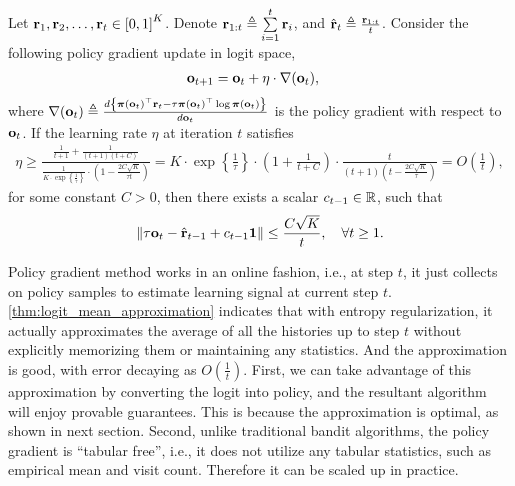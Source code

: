 \begin{thm}
\label{thm:logit_mean_approximation}
Let ${\mathbf{r}}_1, {\mathbf{r}}_2, \dots, {\mathbf{r}}_t \in \left[ 0, 1  \right]^K$. Denote ${\mathbf{r}}_{1:t} \triangleq \sum\limits_{i=1}^{t}{{\mathbf{r}}_i}$, and $\hat{{\mathbf{r}}}_t \triangleq \frac{{\mathbf{r}}_{1:t}}{t}$. Consider the following policy gradient update in logit space,
\begin{equation*}
\begin{split}
    {\mathbf{o}}_{t+1} &= {\mathbf{o}}_t + \eta \cdot \nabla({\mathbf{o}}_t),
\end{split}
\end{equation*}
where $\nabla({\mathbf{o}}_t) \triangleq \frac{d \left\{ {\boldsymbol{\pi}}({\mathbf{o}}_t)^\top {\mathbf{r}}_t - \tau {\boldsymbol{\pi}}({\mathbf{o}}_t)^\top \log{{\boldsymbol{\pi}}({\mathbf{o}}_t)} \right\} }{d {\mathbf{o}}_t} $ is the policy gradient with respect to ${\mathbf{o}}_t$. If the learning rate $\eta$ at iteration $t$ satisfies
\begin{equation*}
\begin{split}
    \eta \ge \frac{ \frac{1}{t+1} + \frac{1}{(t+1)(t+C)} }{ \frac{1}{K \cdot \exp\left\{ \frac{1}{\tau} \right\} } \cdot \left( 1 - \frac{2 C \sqrt{K}}{\tau t} \right)  } = K \cdot \exp\left\{ \frac{1}{\tau} \right\} \cdot \left( 1 + \frac{1}{t+C} \right) \cdot \frac{t}{\left( t+1\right) \left( t - \frac{2C\sqrt{K}}{\tau} \right)} = O\left( \frac{1}{t} \right),
\end{split}
\end{equation*}
for some constant $C > 0$, then there exists a scalar $c_{t-1} \in {\mathbb{R}}$, such that
\begin{equation*}
    \left\| \tau {\mathbf{o}}_{t} - \hat{{\mathbf{r}}}_{t-1} + c_{t-1} {\mathbf{1}} \right\| \le \frac{C \sqrt{K}}{t}, \quad \forall t \ge 1.
\end{equation*}
\end{thm}

Policy gradient method works in an online fashion, i.e., at step $t$, it just collects on policy samples to estimate learning signal at current step $t$.  \cref{thm:logit_mean_approximation} indicates that with entropy regularization, it actually approximates the average of all the histories up to step $t$ without explicitly memorizing them or maintaining any statistics. And the approximation is good, with error decaying as $O\left( \frac{1}{t} \right)$. First, we can take advantage of this approximation by converting the logit into policy, and the resultant algorithm will enjoy provable guarantees. This is because the approximation is optimal, as shown in next section. Second, unlike traditional bandit algorithms, the policy gradient is ``tabular free'', i.e., it does not utilize any tabular statistics, such as empirical mean and visit count. Therefore it can be scaled up in practice.

